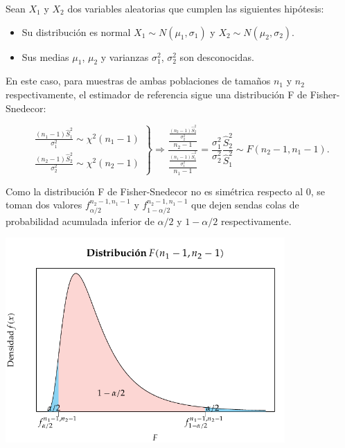 \documentclass[
  a4paper,
]{scrreport}
\providecommand{\tightlist}{%
  \setlength{\itemsep}{0pt}\setlength{\parskip}{0pt}}\usepackage{longtable,booktabs,array}
\theoremstyle{plain}
\theoremstyle{definition}
\theoremstyle{definition}
\theoremstyle{remark}
\begin{document}
Sean \(X_1\) y \(X_2\) dos variables aleatorias que cumplen las
siguientes hipótesis:

\begin{itemize}
\tightlist
\item
  Su distribución es normal \(X_1\sim N(\mu_1,\sigma_1)\) y
  \(X_2\sim N(\mu_2,\sigma_2)\).
\item
  Sus medias \(\mu_1\), \(\mu_2\) y varianzas \(\sigma_1^2\),
  \(\sigma_2^2\) son desconocidas.
\end{itemize}

En este caso, para muestras de ambas poblaciones de tamaños \(n_1\) y
\(n_2\) respectivamente, el estimador de referencia sigue una
distribución F de Fisher-Snedecor:

\[
\left.
\begin{array}{l}
\displaystyle \frac{(n_1-1)\hat{S}_1^2}{\sigma_1^2}\sim \chi^2(n_1-1) \\
\displaystyle \frac{(n_2-1)\hat{S}_2^2}{\sigma_2^2}\sim \chi^2(n_2-1)
\end{array}
\right\}
\Rightarrow
\frac{\frac{\frac{(n_2-1)\hat{S}_2^2}{\sigma_2^2}}{n_2-1}}{\frac{\frac{(n_1-1)\hat{S}_1^2}{\sigma_1^2}}{n_1-1}} =
\frac{\sigma_1^2}{\sigma_2^2}\frac{\hat{S}_2^2}{\hat{S}_1^2}\sim F(n_2-1,n_1-1).
\]

Como la distribución F de Fisher-Snedecor no es simétrica respecto al 0,
se toman dos valores \(f^{n_2-1,n_1-1}_{\alpha/2}\) y
\(f^{n_2-1,n_1-1}_{1-\alpha/2}\) que dejen sendas colas de probabilidad
acumulada inferior de \(\alpha/2\) y \(1-\alpha/2\) respectivamente.

\begin{center}
\includegraphics[width=0.8\textwidth,height=\textheight]{img/estimacion/extremos-intervalo-comparacion-varianzas-normal.pdf}
\end{center}
\end{document}
